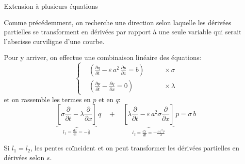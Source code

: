 \documentclass[
mode=present,    %
paper=a4paper,   %
orient=landscape,
display=slides,   %
size=10pt,
style=romain   %
]{powerdot}
\begin{document}
\begin{slide}[toc=]{Extension à plusieurs équations}

Comme précédemment, on recherche une direction selon laquelle les dérivées partielles se transforment en dérivées par rapport à une seule variable qui serait l'abscisse curviligne d'une courbe.

\bigskip

Pour y arriver, on effectue une combinaison linéaire des équations:
        \begin{equation*}
            \left\{
            \begin{aligned}
                & \left( \frac{\partial q}{\partial t} -\varepsilon\, a^2\, \frac{\partial p}{\partial x} = b \right)  &\qquad \times\sigma   \\
                & \left( \frac{\partial p}{\partial t} -\frac{\partial q}{\partial x} = 0 \right)  &\qquad \times\lambda
            \end{aligned}
            \right.
        \end{equation*}
et on rassemble les termes en $p$ et en $q$:
        \begin{equation*}
\underbrace{\left[ \sigma \frac{\partial}{\partial t} - \lambda \frac{\partial}{\partial x}  \right]}_{\displaystyle l_1=\frac{d x}{d t}=-\frac{\lambda}{\sigma}}\, q
\quad + \quad
\underbrace{\left[ \lambda \frac{\partial}{\partial t} -\varepsilon\, a^2 \sigma \frac{\partial}{\partial x}  \right]}_{\displaystyle l_2=\frac{d x}{d t}=-\frac{\varepsilon\, a^2 \sigma}{\lambda}}\, p = \sigma\, b
        \end{equation*}

Si $l_1=l_2$, les pentes coïncident et on peut transformer les dérivées partielles en dérivées selon $s$.

\end{slide}
\end{document}
